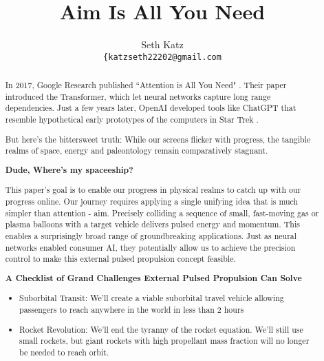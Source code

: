 \documentclass{article}
\title{Aim Is All You Need}
\author{
  Seth Katz \\
  \texttt{\{katzseth22202@gmail.com} \\
}
\begin{document}
\maketitle

\begin{abstract}\label{sec:abstract}
 In 2017, Google Research published ``Attention is All You Need" \cite{vaswani2023attentionneed}.  Their paper introduced the Transformer, which let neural networks capture long range dependencies.   Just a few years later, OpenAI developed tools like ChatGPT \cite{chatgpt} that resemble hypothetical early prototypes of the computers in Star Trek \cite{startrek}.

But here's the bittersweet truth:  While our screens flicker with progress, the tangible realms of space, energy and paleontology remain comparatively stagnant.

\textbf{Dude, Where's my spaceeship?}

This paper's goal is to enable our progress in physical realms to catch up with our progress online.  Our journey requires applying a single unifying idea that is much simpler than attention - aim.   Precisely colliding a sequence of small, fast-moving gas or plasma balloons with a target vehicle delivers pulsed energy and momentum.   This enables a surprisingly broad range of groundbreaking applications.   Just as neural networks enabled consumer AI, they potentially allow us to achieve the precision control to make this external pulsed propulsion concept feasible.

\textbf{A Checklist of Grand Challenges External Pulsed Propulsion Can Solve}
\begin{itemize}
    \item 
Suborbital Transit:  We'll create a viable suborbital travel vehicle allowing passengers to reach anywhere in the world in less than 2 hours
 \item Rocket Revolution: We'll end the tyranny of the rocket equation.   We'll still use small rockets, but giant rockets with high propellant mass fraction will no longer be needed to reach orbit.   
 

\end{itemize}
\end{abstract}
\end{document}
